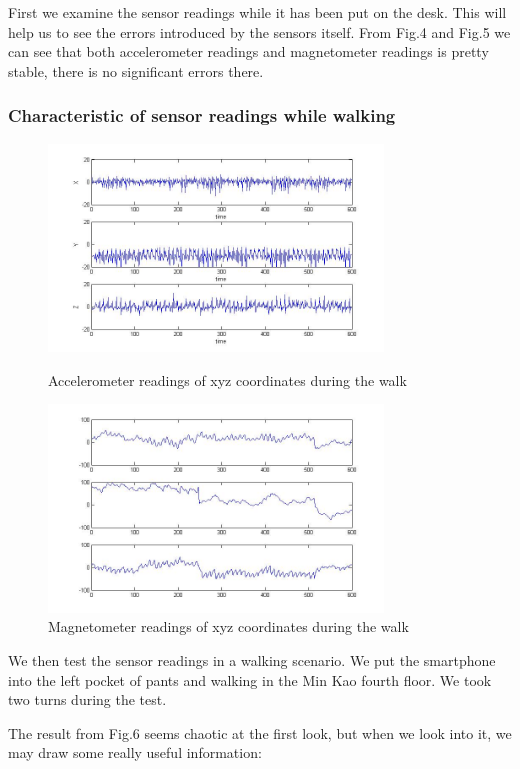 \documentclass[journal]{IEEEtran}
\begin{document}
First we examine the sensor readings while it has been put on the desk.
This will help us to see the errors introduced by the sensors itself.
From Fig.4 and Fig.5 we can see that both accelerometer readings and magnetometer readings is pretty stable, there is no significant errors there.

\subsubsection{Characteristic of sensor readings while walking}
\begin{figure}
	\centering
	\includegraphics[width=3.5in]{figures/AccTest}
	\caption{Accelerometer readings of xyz coordinates during the walk}
	\includegraphics[width=3.5in]{figures/MagTest}
	\caption{Magnetometer readings of xyz coordinates during the walk}
\end{figure}

We then test the sensor readings in a walking scenario.
We put the smartphone into the left pocket of pants and walking in the Min Kao fourth floor.
We took two turns during the test.

The result from Fig.6 seems chaotic at the first look, but when we look into it, we may draw some really useful information:
\end{document}
